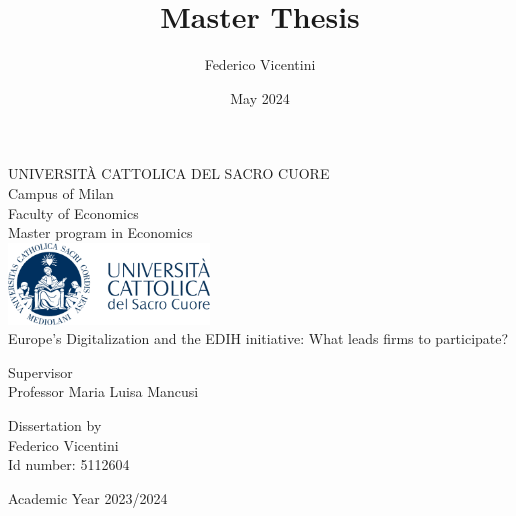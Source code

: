 \documentclass[12pt]{report}
\title{Master Thesis}
\author{Federico Vicentini}
\date{May 2024}
\begin{document}
\begin{titlepage}
    \centering

    \Large UNIVERSITÀ CATTOLICA DEL SACRO CUORE\\
    \Large Campus of Milan\\
    \Large Faculty of Economics\\
    \Large Master program in Economics\\
    \vspace{2cm}
    \includegraphics[width=0.4\textwidth]{Figures/00-logo.png}\\ 
    \vspace{2cm}
    \Huge Europe's Digitalization and the EDIH initiative: What leads firms to participate? \\

    \vspace{2cm}

    \begin{flushleft}
    \large Supervisor \\
    \large Professor Maria Luisa Mancusi
    \end{flushleft}
    
    \vfill
    
    \hfill
    \begin{minipage}{0.3\textwidth}
        \raggedright
        \large Dissertation by\\
        \large Federico Vicentini\\
        \large Id number: 5112604
    \end{minipage}
    
    \vspace{0.8cm}

    \Large{Academic Year 2023/2024}
    
\end{titlepage}

\end{document}
